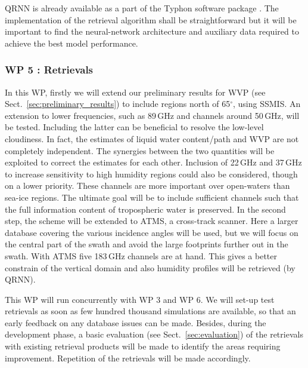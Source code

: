\documentclass[12pt,oneside,a4paper]{article}
\begin{document}
QRNN is already available as a part of the Typhon software package
\citep{lemke:2020:typhon}. The implementation of the retrieval algorithm shall
be straightforward but it will be important to find the
neural-network architecture and auxiliary data required to achieve the best model performance.



\vspace{-1.0ex}
\subsubsection*{WP 5 : Retrievals}
%
\label{sec:retrievals}
%
In this WP, firstly we will extend our preliminary results for WVP (see
Sect.~\ref{sec:preliminary_results}) to include regions north of 65$^\circ$,
using SSMIS. An extension to lower frequencies, such as 89\,GHz and channels
around 50\,GHz, will be tested. Including the latter can be beneficial to
resolve the low-level cloudiness. In fact, the estimates of liquid water
content/path and WVP are not completely independent. The synergies between the
two quantities will be exploited to correct the estimates for each other.
Inclusion of 22\,GHz and 37\,GHz to increase sensitivity to high humidity
regions could also be considered, though on a lower priority. These channels
are more important over open-waters than sea-ice regions. The ultimate goal
will be to include sufficient channels such that the full information content
of tropospheric water is preserved. In the second step, the scheme will be
extended to ATMS, a cross-track scanner. Here a larger database covering the
various incidence angles will be used, but we will focus on the central part of
the swath and avoid the large footprints further out in the swath. With ATMS
five 183\,GHz channels are at hand. This gives a better constrain of the
vertical domain and also humidity profiles will be retrieved (by QRNN).

This WP will run concurrently with WP 3 and WP 6. We will set-up test retrievals as soon as few hundred thousand simulations are available, so that an early feedback on any database issues can be made. Besides, during the development phase, a basic evaluation (see Sect.~\ref{sec:evaluation}) of the retrievals with existing retrieval products will be made to identify the areas requiring improvement. Repetition of the retrievals will be made accordingly.
\end{document}
